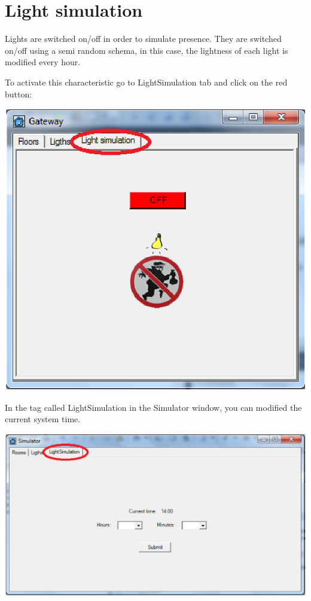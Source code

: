 \section{Light simulation}

Lights are switched on/off in order to simulate presence. They are switched on/off using a semi random schema, in this case, the lightness of each light is modified every hour.

To activate this characteristic go to LightSimulation tab and click on the red button:
\begin{center}
	\includegraphics[width=.75\linewidth]{images/globalLightSimulation.eps}
	\\
\vspace{1cm}
\end{center}

In the tag called LightSimulation in the Simulator window, you can modified the current system time.
\begin{center}
	\includegraphics[width=.99\linewidth]{images/simulatorLightSimulation.eps}
	\\
\vspace{1cm}
\end{center}